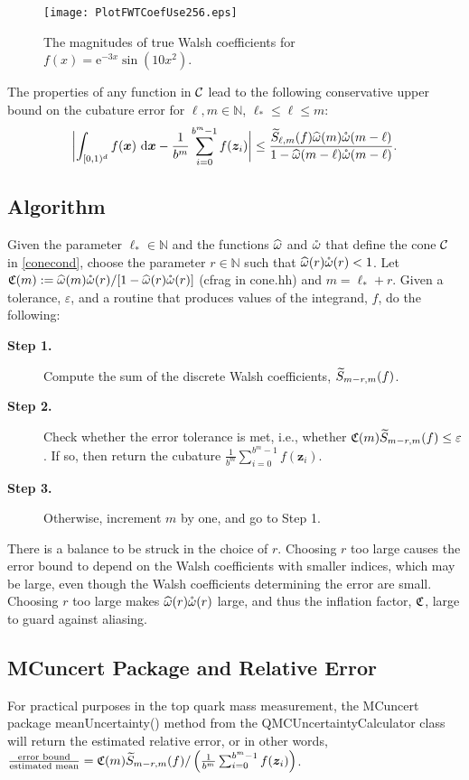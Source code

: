 \documentclass{article}
\newcommand{\N}{\mathbb{N}} %
\newcommand{\D}{\,\mathrm{d}} %
\newcommand{\bsx}{\boldsymbol{x}}    %
\newcommand{\bsz}{\boldsymbol{z}}    %
\begin{document}
\begin{figure}
\centering
\texttt{[image: PlotFWTCoefUse256.eps]}
\caption{The magnitudes of true Walsh coefficients for $f(x)=\mathrm{e}^{-3x}\sin\left(10{x^2}\right)$. \label{Walshcoeffig}}
\end{figure}

The properties of any function in $\mathcal{C}$ lead to the following conservative upper bound on the cubature error for $\ell, m \in \N$, $\ell_* \le \ell \le m$: 
\begin{equation}
\biggabs{\int_{\cube} f(\bsx) \, \D \bsx - \frac{1}{b^m} \sum_{i=0}^{b^m-1} f(\bsz_i) }
\le \frac{\tS_{\ell,m}(f)\homega(m) \wcomega(m-\ell)}{1 - \homega(m-\ell) \wcomega(m-\ell)}. \label{errbd}
\end{equation} 

\subsection{Algorithm}

Given the parameter $\ell_* \in \N$ and the functions $\widehat{\omega}$ and  $\mathring{\omega}$ that define the cone $\mathcal{C}$ in \eqref{conecond}, choose the parameter $r \in \N$ such that $\widehat{\omega}(r)\mathring{\omega}(r)<1$.  Let $\mathfrak{C}(m): = \widehat{\omega}(m)\mathring{\omega}(r)/[1 - \widehat{\omega}(r)\mathring{\omega}(r)]$ (cfrag in cone.hh) and $m=\ell_*+r$.
Given a tolerance, $\varepsilon$, and a routine that produces values of the integrand, $f$, do the following:

\begin{description}
\item[\textbf{Step 1.}] Compute the sum of the discrete Walsh coefficients, $\widetilde{S}_{m-r,m}(f)$.  

\item[\textbf{Step 2.}] Check whether the error tolerance is met, i.e., whether $\mathfrak{C}(m)  \widetilde{S}_{m-r,m}(f) \le \varepsilon$. If so, then return the cubature $\frac{1}{b^m} \sum_{i=0}^{b^m-1} f(\bsz_i)$.

\item[\textbf{Step 3.}] Otherwise, increment $m$ by one, and go to Step 1.
\end{description}


There is a balance to be struck in the choice of $r$.  Choosing $r$ too large causes the error bound to depend on the Walsh coefficients with smaller indices, which may be large, even though the Walsh coefficients determining the error are small.  Choosing $r$ too large makes $\widehat{\omega}(r)\mathring{\omega}(r)$ large, and thus the inflation factor, $\mathfrak{C}$, large to guard against aliasing.

\subsection{MCuncert Package and Relative Error}

For practical purposes in the top quark mass measurement, the MCuncert package meanUncertainty() method from the QMCUncertaintyCalculator class will return the estimated relative error, or in other words, $\frac{\text{error bound}}{\text{estimated mean}}=\fC(m)  \tS_{m-r,m}(f)/\left(\frac{1}{b^m} \sum_{i=0}^{b^m-1} f(\bsz_i)\right)$.
\end{document}
